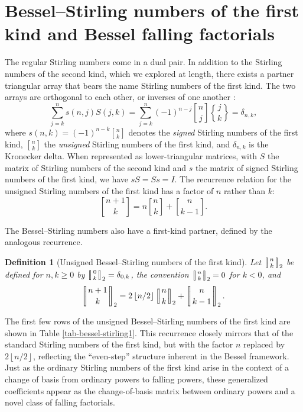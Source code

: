\documentclass[a4paper]{amsart}
\numberwithin{equation}{section}
\newcommand{\Stirling}[0]{\genfrac\{\}{0pt}{}}
\newcommand{\Stirlingone}[0]{\genfrac[]{0pt}{}}
\newcommand{\mStirlingone}[2]{\left[\mkern-3.8mu\middle|\genfrac{}{}{0pt}{}{#1}{#2}\middle|\mkern-3.8mu\right]}
\newcommand{\floor}[1]{\left\lfloor #1 \right\rfloor}
\newtheorem{definition}[theorem]{Definition}
\begin{document}
\section{Bessel--Stirling numbers of the first kind and Bessel falling factorials}\label{sec-first-kind}
\noindent The regular Stirling numbers come in a dual pair. In addition to the Stirling numbers of the second kind, which we explored at length, there exists a partner triangular array that bears the name Stirling numbers of the first kind. The two arrays are orthogonal to each other, or inverses of one another \cite{riordan_inverse_1964}:
\[
\sum_{j=k}^n s(n,j)S(j,k)=\sum_{j=k}^n(-1)^{n-j} \Stirlingone{n}{j}\Stirling{j}{k} = \delta_{n,k},
\]
where $s(n,k) = (-1)^{n-k}\Stirlingone{n}{k}$ denotes the \textit{signed} Stirling numbers of the first kind, $\Stirlingone{n}{k}$ the \textit{unsigned} Stirling numbers of the first kind, and $\delta_{n,k}$ is the Kronecker delta. When represented as lower-triangular matrices, with $S$ the matrix of Stirling numbers of the second kind and $s$ the matrix of signed Stirling numbers of the first kind, we have $sS = Ss = I$. The recurrence relation for the unsigned Stirling numbers of the first kind has a factor of $n$ rather than $k$:
\[
\Stirlingone{n+1}{k} = n\Stirlingone{n}{k} + \Stirlingone{n}{k-1}.
\]

The Bessel--Stirling numbers also have a first-kind partner, defined by the analogous recurrence.
\begin{definition}[Unsigned Bessel--Stirling numbers of the first kind]\label{def-bs1}
Let $\mStirlingone{n}{k}_2$ be defined for $n, k \geq 0$ by $\mStirlingone{0}{k}_2 = \delta_{0,k}$, the convention $\mStirlingone{n}{k}_2 = 0$ for $k<0$, and
    \[
    \mStirlingone{n+1}{k}_2 = 2\floor{n/2}\mStirlingone{n}{k}_2 + \mStirlingone{n}{k-1}_2.
    \]
\end{definition}

The first few rows of the unsigned Bessel--Stirling numbers of the first kind are shown in Table \ref{tab-bessel-stirling1}. This recurrence closely mirrors that of the standard Stirling numbers of the first kind, but with the factor $n$ replaced by $2\floor{n/2}$, reflecting the ``even-step'' structure inherent in the Bessel framework. Just as the ordinary Stirling numbers of the first kind arise in the context of a change of basis from ordinary powers to falling powers, these generalized coefficients appear as the change-of-basis matrix between ordinary powers and a novel class of falling factorials.
\end{document}
